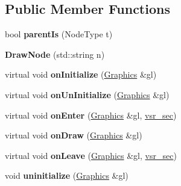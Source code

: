 \subsection*{Public Member Functions}
\begin{DoxyCompactItemize}
\item 
\hypertarget{classvsr_1_1_draw_node_ae10d41c034b47ca5a14abf422d2c023b}{bool {\bfseries parent\-Is} (Node\-Type t)}\label{classvsr_1_1_draw_node_ae10d41c034b47ca5a14abf422d2c023b}

\item 
\hypertarget{classvsr_1_1_draw_node_a347297e860ac5bd7761f408a1c976876}{{\bfseries Draw\-Node} (std\-::string n)}\label{classvsr_1_1_draw_node_a347297e860ac5bd7761f408a1c976876}

\item 
\hypertarget{classvsr_1_1_draw_node_ace935235559dc3a205fcca61f0e53073}{virtual void {\bfseries on\-Initialize} (\hyperlink{classvsr_1_1_graphics}{Graphics} \&gl)}\label{classvsr_1_1_draw_node_ace935235559dc3a205fcca61f0e53073}

\item 
\hypertarget{classvsr_1_1_draw_node_a10449bb9a3eac5122f24ba4e35a43d0f}{virtual void {\bfseries on\-Un\-Initialize} (\hyperlink{classvsr_1_1_graphics}{Graphics} \&gl)}\label{classvsr_1_1_draw_node_a10449bb9a3eac5122f24ba4e35a43d0f}

\item 
\hypertarget{classvsr_1_1_draw_node_a1a274b25321ca8d01fc800dfaab866de}{virtual void {\bfseries on\-Enter} (\hyperlink{classvsr_1_1_graphics}{Graphics} \&gl, \hyperlink{classvsr_1_1vsr__sec}{vsr\-\_\-sec})}\label{classvsr_1_1_draw_node_a1a274b25321ca8d01fc800dfaab866de}

\item 
\hypertarget{classvsr_1_1_draw_node_a2aa28f9cb79f119e5bc32f16bb1aa45e}{virtual void {\bfseries on\-Draw} (\hyperlink{classvsr_1_1_graphics}{Graphics} \&gl)}\label{classvsr_1_1_draw_node_a2aa28f9cb79f119e5bc32f16bb1aa45e}

\item 
\hypertarget{classvsr_1_1_draw_node_a3856aa1d9965f754402e4fa3858e385f}{virtual void {\bfseries on\-Leave} (\hyperlink{classvsr_1_1_graphics}{Graphics} \&gl, \hyperlink{classvsr_1_1vsr__sec}{vsr\-\_\-sec})}\label{classvsr_1_1_draw_node_a3856aa1d9965f754402e4fa3858e385f}

\item 
\hypertarget{classvsr_1_1_draw_node_abe1e1a6c09a6ba8ec97f1a4c47d344f0}{void {\bfseries uninitialize} (\hyperlink{classvsr_1_1_graphics}{Graphics} \&gl)}\label{classvsr_1_1_draw_node_abe1e1a6c09a6ba8ec97f1a4c47d344f0}


\end{DoxyCompactItemize}
